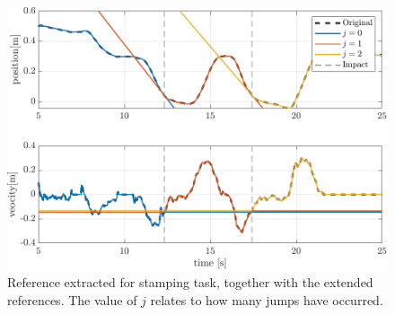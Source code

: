 \documentclass[11pt]{report}
\numberwithin{equation}{section}        %
\numberwithin{figure}{section}          %
\numberwithin{table}{section}           %
\begin{document}
  \begin{figure}[]
  \centering
  \begin{adjustwidth}{0pt}{5pt}
  \includegraphics[right]{Graphics/spreading.pdf}
  \end{adjustwidth}
  \caption{Reference extracted for stamping task, together with the extended references. The value of $j$ relates to how many jumps have occurred.}
  \label{fig:spreading}
  \end{figure}
\end{document}
